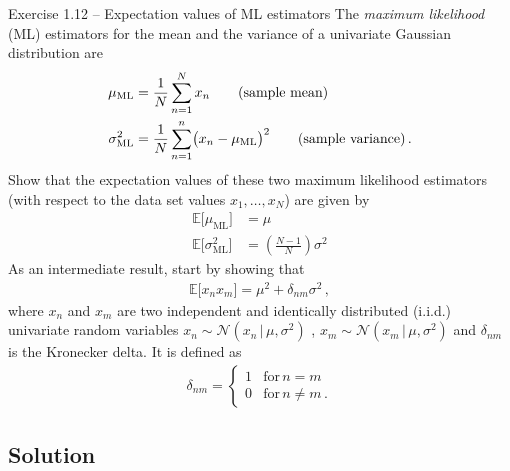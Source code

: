 \documentclass[11pt,DINA4, fleqn]{amsart}
\begin{document}
\begin{mybox_tc3}{Exercise 1.12 -- Expectation values of ML estimators}
The \emph{maximum likelihood} (ML) estimators for the mean and the variance of a univariate Gaussian distribution are
\begin{align}
\mu_{\text{ML}} &= \dfrac{1}{N} \sum\displaylimits_{n = 1}^{N} x_n \qquad \text{(sample mean)} \\
\sigma^2_{\text{ML}} &= \dfrac{1}{N} \sum\displaylimits_{n = 1}^{n}\bigl(x_n - \mu_{\text{ML}}\bigl)^2 \qquad \text{(sample variance)} \, .
\end{align}
Show that the expectation values of these two maximum likelihood estimators (with respect to the data set values $x_1, \dots, x_N$) are given by
\begin{align}
\mathbb{E}\bigl[\mu_{\text{ML}}\bigl] &= \mu \\
\mathbb{E}\bigl[\sigma^2_{\text{ML}}\bigl] &= \left(\frac{N - 1}{N}\right) \sigma^2
\end{align}
As an intermediate result, start by showing that
\begin{align}
\mathbb{E}\bigl[x_n x_m\bigl] = \mu^2 + \delta_{nm} \sigma^2 \, ,
\label{eq:interResult}
\end{align}
where $x_n$ and $x_m$ are two independent and identically distributed (i.i.d.) univariate random variables $x_n \sim \mathcal{N}\left(x_n \,\bigl| \, \mu, \sigma^2\right)$ , $x_m\sim \mathcal{N}(x_m \, \bigl| \, \mu, \sigma^2)$ and $\delta_{nm}$ is the Kronecker delta.
It is defined as
\begin{align}
\delta_{nm} = \begin{cases}
1 & \text{for} \, n = m \\
0 & \text{for} \, n \neq m \, .
\end{cases}
\end{align}
\end{mybox_tc3}

\subsection*{Solution}
\end{document}
